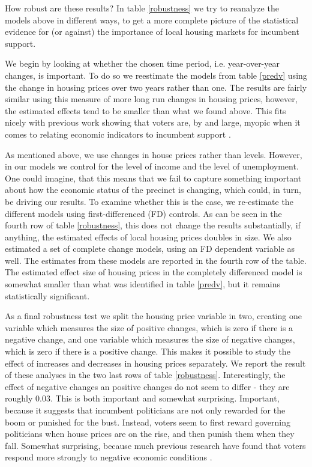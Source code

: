 \documentclass[12pt,a4paper]{article}
\begin{document}
How robust are these results? In table \ref{robustness} we try to reanalyze the models above in different ways, to get a more complete picture of the statistical evidence for (or against) the importance of local housing markets for incumbent support. 

We begin by looking at whether the chosen time period, i.e. year-over-year changes, is important. To do so we reestimate the models from table \ref{predv} using the change in housing prices over two years rather than one. The results are fairly similar using this measure of more long run changes in housing prices, however, the estimated effects tend to be smaller than what we found above. This fits nicely with previous work showing that voters are, by and large, myopic when it comes to relating economic indicators to incumbent support \citep{healy2009myopic,healy2014substituting}. 

As mentioned above, we use changes in house prices rather than levels. However, in our models we control for the level of income and the level of unemployment. One could imagine, that this means that we fail to capture something important about how the economic status of the precinct is changing, which could, in turn, be driving our results. To examine whether this is the case, we re-estimate the different models using first-differenced (FD) controls. As can be seen in the fourth row of table \ref{robustness}, this does not change the results substantially, if anything, the estimated effects of local housing prices doubles in size. We also estimated a set of complete change models, using an FD dependent variable as well. The estimates from these models are reported in the fourth row of the table. The estimated effect size of housing prices in the completely differenced model is somewhat smaller than what was identified in table \ref{predv}, but it remains statistically significant.

As a final robustness test we split the housing price variable in two, creating one variable which measures the size of positive changes, which is zero if there is a negative change, and one variable which measures the size of negative changes, which is zero if there is a positive change. This makes it possible to study the effect of increases and decreases in housing prices separately. We report the result of these analyses in the two last rows of table \ref{robustness}. Interestingly, the effect of negative changes an positive changes do not seem to differ - they are roughly 0.03. This is both important and somewhat surprising. Important, because it suggests that incumbent politicians are not only rewarded for the boom or punished for the bust. Instead, voters seem to first reward governing politicians when house prices are on the rise, and then punish them when they fall. Somewhat surprising, because much previous research have found that voters respond more strongly to negative economic conditions \citep[e.g.][]{bloom1975voter,headrick1991attention,soroka2014negativity}.
\end{document}
